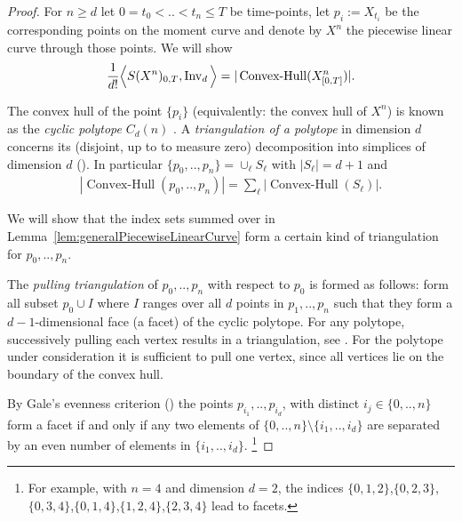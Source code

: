 \documentclass{scrartcl}
\theoremstyle{plain}
\theoremstyle{definition}
\newcommand{\1}[1]{1_{\{#1\}}}
\newcommand{\ds}{d} %
\begin{document}
\begin{proof}
  For $n\ge \ds$ let $0 = t_0 <  .. < t_n \le T$ be time-points, let $p_i := X_{t_i}$ be
  the corresponding points on the moment curve
  and denote by $X^n$ the piecewise linear curve through those points.
  We will show
  \begin{align*}
    \frac{1}{\ds !} \Big\langle S(X^n)_{0,T}, \firstInvariant{\ds} \Big\rangle
    =
    |\operatorname{Convex-Hull}( X^n_{[0,T]} )|.
  \end{align*}

  The convex hull of the point $\{p_i\}$ (equivalently: the convex hull of $X^n$)
  is known as the \emph{cyclic polytope} $C_\ds(n)$ \cite[Section 15.5.1.4]{bib:TOG2004}.
  A \emph{triangulation of a polytope} in dimension $\ds$ concerns its 
  (disjoint, up to to measure zero) decomposition
  into simplices of dimension $\ds$ (\cite[Chapter 16]{bib:TOG2004}).
  In particular $\{p_0, .., p_n \} = \cup_\ell S_\ell$ with $|S_\ell| = \ds+1$
  and
  \begin{align*}
    |\operatorname{Convex-Hull}( p_0,..,p_n )|
    =
    \sum_\ell |\operatorname{Convex-Hull}( S_\ell )|.
  \end{align*}

  We will show that the index sets summed over in %
  Lemma~\ref{lem:generalPiecewiseLinearCurve} form
  a certain kind of triangulation for $p_0,..,p_n$.

  The \emph{pulling triangulation} of $p_0,..,p_n$ with respect to $p_0$ is formed as follows:
  form all subset $p_0 \cup I$ where
  $I$ ranges over all $\ds$ points in $p_1,..,p_n$ such that they form
  a $\ds-1$-dimensional face (a facet) of the cyclic polytope.
  For any polytope, successively pulling each vertex results
  in a triangulation, see \cite[Chapter 16]{bib:TOG2004}. %
  For the polytope under consideration it is sufficient to pull one vertex, since
  all vertices lie on the boundary of the convex hull.

  By Gale's evenness criterion (\cite[Theorem 3]{bib:Gal1963})
  the points $p_{i_1}, .., p_{i_\ds}$,
  with distinct $i_j \in \{0,..,n\}$ form a facet if and only if 
  any two elements of $\{0,..,n\} \setminus \{i_1, .., i_\ds\}$
  are separated by an even number of elements in $\{i_1, .., i_\ds\}$.%
  \footnote{
    For example,
    with $n=4$ and dimension $\ds=2$,
    the indices $\{0,1,2\}$,$\{0,2,3\}$,$\{0,3,4\}$,$\{0,1,4\}$,$\{1,2,4\}$,$\{2,3,4\}$
    lead to facets.
  }
  

\end{proof}
\end{document}
